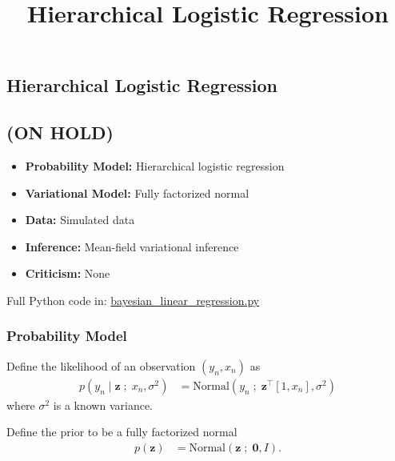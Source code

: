 \title{Hierarchical Logistic Regression}

\subsection{Hierarchical Logistic Regression}

\subsection{(ON HOLD)}

\begin{itemize}
  \item \textbf{Probability Model:} Hierarchical logistic regression
  \item \textbf{Variational Model:} Fully factorized normal
  \item \textbf{Data:} Simulated data
  \item \textbf{Inference:} Mean-field variational inference
  \item \textbf{Criticism:} None
\end{itemize}

Full Python code in:
\href{https://github.com/blei-lab/edward/blob/master/examples/tf_hierarchical_logistic_regression.py}
{bayesian_linear_regression.py}


\subsubsection{Probability Model}
Define the likelihood of an observation $(y_n, x_n)$ as
\begin{align*}
  p(y_n \mid \mathbf{z} \;;\; x_n, \sigma^2)
  &=
  \text{Normal}(y_n \;;\; \mathbf{z}^\top [1, x_n], \sigma^2)
\end{align*}
where $\sigma^2$ is a known variance.

Define the prior to be a fully factorized normal
\begin{align*}
  p(\mathbf{z})
  &=
  \text{Normal}(\mathbf{z} \;;\; \mathbf{0}, I).
\end{align*}

